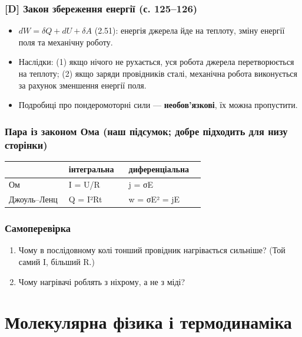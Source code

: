 \documentclass[11pt,a4paper,oneside]{book}
\begin{document}
\section*{[D] Закон збереження енергії (с. 125–126)}
\begin{itemize}
\item $dW = \delta Q + dU + \delta A$ (2.51): енергія джерела йде на теплоту, зміну енергії поля та механічну роботу.
\item Наслідки: (1) якщо нічого не рухається, уся робота джерела перетворюється на теплоту; (2) якщо заряди провідників сталі, механічна робота виконується за рахунок зменшення енергії поля.
\item Подробиці про пондеромоторні сили — \textbf{необов'язкові}, їх можна пропустити.
\end{itemize}

\section*{Пара із законом Ома (наш підсумок; добре підходить для низу сторінки)}
{\small
\begin{longtable}{>{\raggedright\arraybackslash}p{0.291\linewidth}>{\raggedright\arraybackslash}p{0.291\linewidth}>{\raggedright\arraybackslash}p{0.370\linewidth}}
\toprule
\textbf{} & \textbf{інтегральна} & \textbf{диференціальна} \\
\midrule
\endhead
Ом & I = U/R & j = σE \\
Джоуль–Ленц & Q = I²Rt & w = σE² = jE \\
\bottomrule
\end{longtable}
}

\section*{Самоперевірка}
\begin{enumerate}
\item Чому в послідовному колі тонший провідник нагрівається сильніше? (Той самий I, більший R.)
\item Чому нагрівачі роблять з ніхрому, а не з міді?
\end{enumerate}

\part{Молекулярна фізика і термодинаміка}
\end{document}
